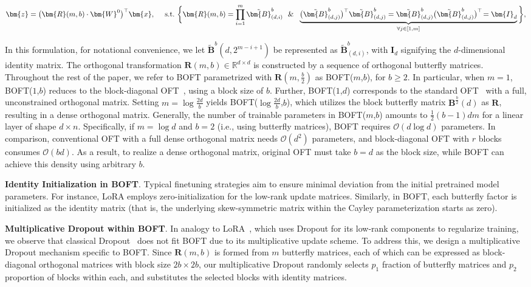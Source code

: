 \begin{equation}
    \begin{aligned}\nonumber
    \bm{z}=\big(\bm{R}(m,b)\cdot\bm{W}^0\big)^\top\bm{x},~~~~\text{s.t.}~\bigg{\{}\bm{R}(m,b)=\prod_{i=1}^m \tilde{\bm{B}}^b_{(d,i)}~~\&~~\underbrace{\big(\tilde{\bm{B}}^b_{(d,j)}\big)^\top\tilde{\bm{B}}^b_{(d,j)}=\tilde{\bm{B}}^b_{(d,j)}\big(\tilde{\bm{B}}^b_{(d,j)}\big)^\top\!=\bm{I}_d}_{\forall j\in [1, m]}\bigg{\}},
    \end{aligned}
\end{equation}

In this formulation, for notational convenience, we let $\tilde{\bm{B}}^b(d,2^{m - i+1})$ be represented as $\tilde{\bm{B}}^b_{(d,i)}$, with $\bm{I}_d$ signifying the $d$-dimensional identity matrix. The orthogonal transformation $\bm{R}(m,b)\in\mathbb{R}^{d\times d}$ is constructed by a sequence of orthogonal butterfly matrices. Throughout the rest of the paper, we refer to BOFT parametrized with $\bm{R}(m,\frac{b}{2})$ as BOFT($m$,$b$), for $b\geq 2$. In particular, when $m=1$, BOFT($1$,$b$) reduces to the block-diagonal OFT~\cite{qiu2023controlling}, using a block size of $b$. Further, BOFT($1$,$d$) corresponds to the standard OFT~\cite{qiu2023controlling} with a full, unconstrained orthogonal matrix. Setting $m=\log \frac{2d}{b}$ yields BOFT($\log \frac{2d}{b}$,$b$), which utilizes the block butterfly matrix $\bm{B}^{\frac{b}{2}}(d)$ as $\bm{R}$, resulting in a dense orthogonal matrix. Generally, the number of trainable parameters in BOFT($m$,$b$) amounts to $\frac{1}{2}(b-1)dm$ for a linear layer of shape $d\times n$. Specifically, if $m=\log d$ and $b=2$ (i.e., using butterfly matrices), BOFT requires $\mathcal{O}(d\log d)$ parameters. In comparison, conventional OFT with a full dense orthogonal matrix needs $\mathcal{O}(d^2)$ parameters, and block-diagonal OFT with $r$ blocks consumes $\mathcal{O}(bd)$. As a result, to realize a dense orthogonal matrix, original OFT must take $b=d$ as the block size, while BOFT can achieve this density using arbitrary $b$.

\textbf{Identity Initialization in BOFT}. Typical finetuning strategies aim to ensure minimal deviation from the initial pretrained model parameters. For instance, LoRA employs zero-initialization for the low-rank update matrices. Similarly, in BOFT, each butterfly factor is initialized as the identity matrix (that is, the underlying skew-symmetric matrix within the Cayley parameterization starts as zero).

\textbf{Multiplicative Dropout within BOFT}. In analogy to LoRA~\cite{hulora2022}, which uses Dropout for its low-rank components to regularize training, we observe that classical Dropout~\cite{srivastava2014dropout} does not fit BOFT due to its multiplicative update scheme. To address this, we design a multiplicative Dropout mechanism specific to BOFT. Since $\bm{R}(m,b)$ is formed from $m$ butterfly matrices, each of which can be expressed as block-diagonal orthogonal matrices with block size $2b\times 2b$, our multiplicative Dropout randomly selects $p_1$ fraction of butterfly matrices and $p_2$ proportion of blocks within each, and substitutes the selected blocks with identity matrices.

